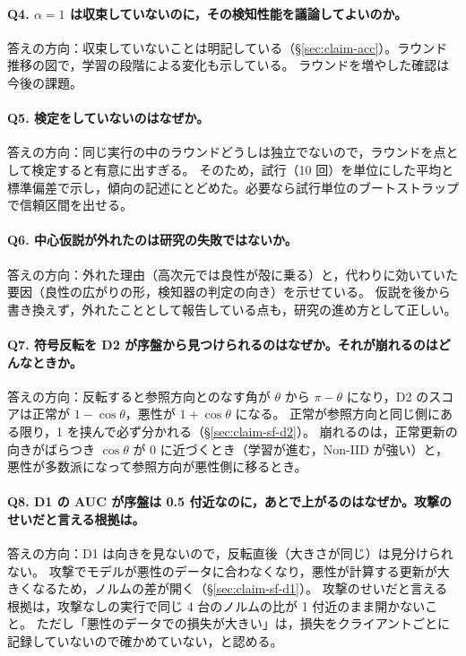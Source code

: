 \documentclass[a4j, dvipdfmx]{jsarticle}  %
\begin{document}
\paragraph{Q4. $\alpha = 1$ は収束していないのに，その検知性能を議論してよいのか。}
答えの方向：収束していないことは明記している（\S\ref{sec:claim-acc}）。ラウンド推移の図で，学習の段階による変化も示している。
ラウンドを増やした確認は今後の課題。

\paragraph{Q5. 検定をしていないのはなぜか。}
答えの方向：同じ実行の中のラウンドどうしは独立でないので，ラウンドを点として検定すると有意に出すぎる。
そのため，試行（10 回）を単位にした平均と標準偏差で示し，傾向の記述にとどめた。必要なら試行単位のブートストラップで信頼区間を出せる。

\paragraph{Q6. 中心仮説が外れたのは研究の失敗ではないか。}
答えの方向：外れた理由（高次元では良性が殻に乗る）と，代わりに効いていた要因（良性の広がりの形，検知器の判定の向き）を示せている。
仮説を後から書き換えず，外れたこととして報告している点も，研究の進め方として正しい。

\paragraph{Q7. 符号反転を D2 が序盤から見つけられるのはなぜか。それが崩れるのはどんなときか。}
答えの方向：反転すると参照方向とのなす角が $\theta$ から $\pi - \theta$ になり，D2 のスコアは正常が $1 - \cos\theta$，悪性が $1 + \cos\theta$ になる。
正常が参照方向と同じ側にある限り，1 を挟んで必ず分かれる（\S\ref{sec:claim-sf-d2}）。
崩れるのは，正常更新の向きがばらつき $\cos\theta$ が 0 に近づくとき（学習が進む，Non-IID が強い）と，悪性が多数派になって参照方向が悪性側に移るとき。

\paragraph{Q8. D1 の AUC が序盤は 0.5 付近なのに，あとで上がるのはなぜか。攻撃のせいだと言える根拠は。}
答えの方向：D1 は向きを見ないので，反転直後（大きさが同じ）は見分けられない。
攻撃でモデルが悪性のデータに合わなくなり，悪性が計算する更新が大きくなるため，ノルムの差が開く（\S\ref{sec:claim-sf-d1}）。
攻撃のせいだと言える根拠は，攻撃なしの実行で同じ 4 台のノルムの比が 1 付近のまま開かないこと。
ただし「悪性のデータでの損失が大きい」は，損失をクライアントごとに記録していないので確かめていない，と認める。
\end{document}
